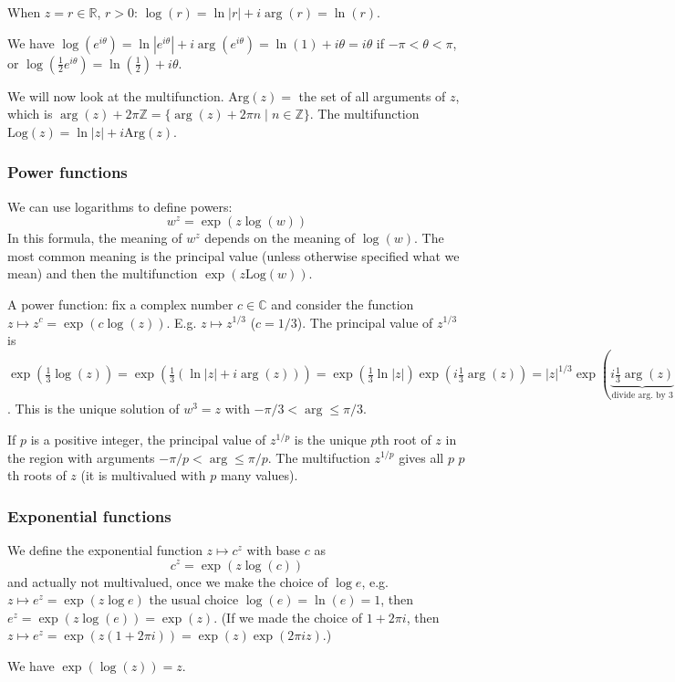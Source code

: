 \documentclass{article}
\theoremstyle{plain}
\theoremstyle{remark}
\newcommand{\Z}{{\mathbb Z}}
\newcommand{\R}{{\mathbb R}}
\newcommand{\C}{{\mathbb C}}
\begin{document}
When $z = r \in \R$, $r > 0$: $\log(r) = \ln|r| + i\arg(r) = \ln(r)$.

We have $\log(e^{i\theta}) = \ln\left|e^{i\theta}\right| + i\arg(e^{i\theta})
= \ln(1) + i\theta = i\theta$ if $ - \pi < \theta < \pi$,
or $\log(\frac12 e^{i\theta}) = \ln(\frac12) + i\theta$.

We will now look at the multifunction.
$\mathrm{Arg}(z) = $ the set of all arguments of $z$,
which is $\arg(z) + 2\pi \Z = \{\arg(z) + 2\pi n \mid n \in \Z\}$.
The multifunction $\mathrm{Log}(z) = \ln|z| + i\mathrm{Arg}(z)$.

\subsubsection{Power functions}

We can use logarithms to define powers:
\[
	w^z = \exp(z\log(w))
\]
In this formula, the meaning of $w^z$ depends on the meaning of $\log(w)$.
The most common meaning is the principal value
(unless otherwise specified what we mean) and then the multifunction $\exp(z\mathrm{Log}(w))$.

A power function: fix a complex number $c \in \C$ and consider the function
$z \mapsto z^c = \exp(c \log(z))$.
E.g. $z \mapsto z^{1/3}$ ($c = 1/3$).
The principal value of $z^{1/3}$ is
$\exp(\frac13 \log(z)) = \exp(\frac13(\ln|z| + i\arg(z)))
= \exp(\frac13\ln|z|) \exp(i\frac13 \arg(z))
= |z|^{1/3}\exp(\underbrace{i \frac13 \arg(z)}_{\text{divide arg. by }3})$.
This is the unique solution of $w^3 = z$ with $-\pi/3 < \arg \leq \pi/3$.

If $p$ is a positive integer,
the principal value of $z^{1/p}$ is the unique $p$th root of $z$
in the region with arguments $-\pi/p < \arg \leq \pi/p$.
The multifuction $z^{1/p}$ gives all $p$ $p$th roots of $z$
(it is multivalued with $p$ many values).

\subsubsection{Exponential functions}
We define the exponential function $z \mapsto c^z$ with base $c$ as
\[
	c^z = \exp(z \log(c))
\]
and actually not multivalued,
once we make the choice of $\log{e}$,
e.g. $z \mapsto e^z = \exp(z\log{e})$
the usual choice $\log(e) = \ln(e) = 1$,
then $e^z = \exp(z \log(e)) = \exp(z)$.
(If we made the choice of $1 + 2\pi i$, then
$z \mapsto e^z = \exp(z(1+2\pi i)) = \exp(z)\exp(2\pi i z)$.)

We have $\exp(\log(z)) = z$.
\end{document}
